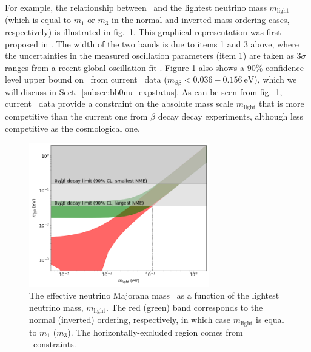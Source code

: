 For example, the relationship between \mbb\ and the lightest neutrino mass $m_{\text{light}}$ (which is equal to $m_1$ or $m_3$ in the normal and inverted mass ordering cases, respectively) is illustrated in fig.~\ref{fig:mbetabetavsmlight}. This graphical representation was first proposed in \cite{Vissani:1999tu}. The width of the two bands is due to items 1 and 3 above, where the uncertainties in the measured oscillation parameters (item 1) are taken as $3\sigma$ ranges from a recent global oscillation fit \cite{Esteban:2020cvm}. Figure \ref{fig:mbetabetavsmlight} also shows a 90\% confidence level upper bound on \mbb\ from current \bbonu\ data ($m_{\beta\beta}<0.036-0.156\ \text{eV}$), which we will discuss in Sect.~\ref{subsec:bb0nu_expstatus}. As can be seen from fig.~\ref{fig:mbetabetavsmlight}, current \bbonu\ data provide a constraint on the absolute mass scale $m_{\text{light}}$ that is more competitive than the current one from $\beta$ decay decay experiments, although less competitive as the cosmological one.
%
\begin{figure}[t!b!]
\begin{center}
\includegraphics[width=0.7\textwidth]{img/mbetabetavsmlight.png}
\end{center}
\caption{\label{fig:mbetabetavsmlight}The effective neutrino Majorana mass \mbb\ as a function of the lightest neutrino mass, $m_{\text{light}}$. The red (green) band corresponds to the normal (inverted) ordering, respectively, in which case $m_{\text{light}}$ is equal to $m_1$ ($m_3$). The horizontally-excluded region comes from \bbonu\ constraints.}
\end{figure}

